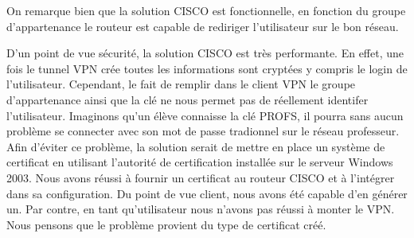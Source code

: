 On remarque bien que la solution CISCO est fonctionnelle, en fonction du groupe d'appartenance le routeur est capable de rediriger l'utilisateur sur le bon réseau.

D'un point de vue sécurité, la solution CISCO est très performante. En effet, une fois le tunnel VPN crée toutes les informations sont cryptées y compris le login de l'utilisateur. Cependant, le fait de remplir dans le client VPN le groupe d'appartenance ainsi que la clé ne nous permet pas de réellement identifer l'utilisateur. Imaginons qu'un élève connaisse la clé PROFS, il pourra sans aucun problème se connecter avec son mot de passe tradionnel sur le réseau professeur. Afin d'éviter ce problème, la solution serait de mettre en place un système de certificat en utilisant l'autorité de certification installée sur le serveur Windows 2003. Nous avons réussi à fournir un certificat au routeur CISCO et à l'intégrer dans sa configuration. Du point de vue client, nous avons été capable d'en générer un. Par contre, en tant qu'utilisateur nous n'avons pas réussi à monter le VPN. Nous pensons que le problème provient du type de certificat créé.
